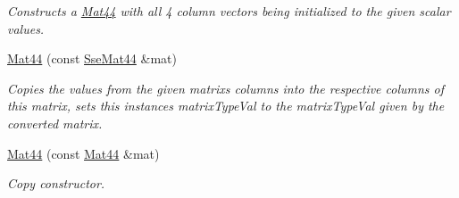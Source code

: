 \begin{DoxyCompactItemize}
\begin{DoxyCompactList}\small\item\em Constructs a \hyperlink{classgfxmath_1_1_mat44}{Mat44} with all 4 column vectors being initialized to the given scalar values. \end{DoxyCompactList}\item 
\hyperlink{classgfxmath_1_1_mat44_a8fafc4c0ac33fb5a3589c43466d1b0c7}{Mat44} (const \hyperlink{classgfxmath_1_1_sse_mat44}{Sse\+Mat44} \&mat)
\begin{DoxyCompactList}\small\item\em Copies the values from the given matrix\textquotesingle{}s columns into the respective columns of this matrix, sets this instance\textquotesingle{}s matrix\+Type\+Val to the matrix\+Type\+Val given by the converted matrix. \end{DoxyCompactList}\item 
\hyperlink{classgfxmath_1_1_mat44_abcebf9e54a3a7954d4f870d1e076517a}{Mat44} (const \hyperlink{classgfxmath_1_1_mat44}{Mat44} \&mat)
\begin{DoxyCompactList}\small\item\em Copy constructor. \end{DoxyCompactList}\end{DoxyCompactItemize}
